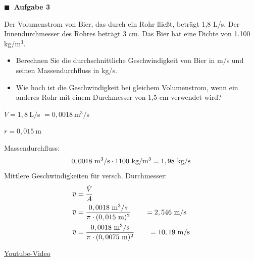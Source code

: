 \documentclass[aspectratio=169,9pt]{beamer}
\newcommand{\pp}{\par \vspace*{2mm}}
\newcommand{\antwort}[1]{
\begin{tcolorbox}[
	enhanced,
	colframe=unigrau!65,
	sharp corners,
	boxsep=1pt,
	colback=white,
	coltitle=black,
]
	#1
	\end{tcolorbox}
}
\begin{document}
\begin{frame}
\begin{minipage}{.5\textwidth}
{\color{miugray}$\blacksquare ~$} \textbf{Aufgabe 3} \par \vspace*{2mm}
Der Volumenstrom von Bier, das durch ein Rohr fließt, beträgt 1,8 L/s. Der
Innendurchmesser des Rohres beträgt 3 cm. Das Bier hat eine Dichte von 1.100 kg/m$^3$.

\begin{itemize}
\item Berechnen Sie die durchschnittliche Geschwindigkeit von Bier in m/s und seinen Massendurchfluss in kg/s.
\item Wie hoch ist die Geschwindigkeit bei gleichem Volumenstrom, wenn ein anderes Rohr mit einem Durchmesser von 1,5 cm verwendet wird?
\end{itemize}

\end{minipage}%
\hspace*{4mm}
\begin{minipage}{.5\textwidth}
\antwort{
$\dot{V} = 1,8 ~$L$/$s $ = 0,0018~$m$^3/$s \par 
$r=0,015~$m \pp
Massendurchfluss:
\begin{align*}
0,0018~\text{m}^3/\text{s} \cdot 1100~\text{kg}/\text{m}^3 = 1,98~\text{kg}/\text{s}
\end{align*}
Mittlere Geschwindigkeiten für versch. Durchmesser:
\begin{align*}
\overline{v} &= \frac{\dot{V}}{A} \\ 
\overline{v} &= \frac{0,0018~\text{m}^3/s}{\pi \cdot (0,015~\text{m})^2} \qquad = 2,546~\text{m}/\text{s} \\
\overline{v} &= \frac{0,0018~\text{m}^3/\text{s}}{\pi \cdot (0,0075~\text{m})^2} \qquad = 10,19~\text{m}/\text{s} \\
\end{align*}
}
\end{minipage}%
\end{frame}

\begin{frame}

\begin{center}
\href{https://www.youtube.com/watch?v=B6h5pVETbd8}{{\color{red}\faYoutube} Youtube-Video}
\end{center}
\end{frame}
\end{document}
